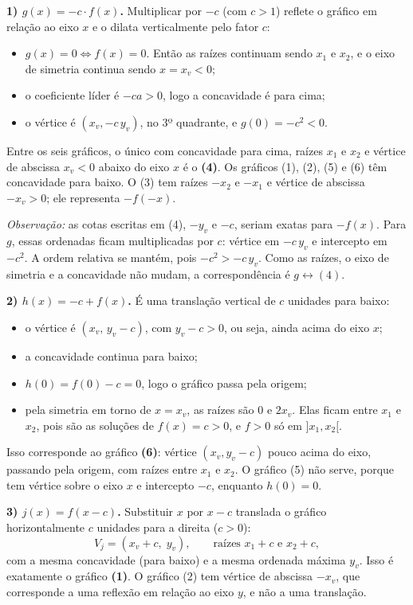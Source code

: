 \documentclass{article}%
\begin{document}
\textbf{1) $g(x)=-c\cdot f(x)$.} Multiplicar por $-c$ (com $c>1$) reflete o gráfico em relação ao eixo $x$ e o dilata verticalmente pelo fator $c$:
\begin{itemize}
\item $g(x)=0 \iff f(x)=0$. Então as raízes continuam sendo $x_1$ e $x_2$, e o eixo de simetria continua sendo $x=x_v<0$;
\item o coeficiente líder é $-ca>0$, logo a concavidade é para cima;
\item o vértice é $(x_v,-c\,y_v)$, no 3º quadrante, e $g(0)=-c^2<0$.
\end{itemize}
Entre os seis gráficos, o único com concavidade para cima, raízes $x_1$ e $x_2$ e vértice de abscissa $x_v<0$ abaixo do eixo $x$ é o \textbf{(4)}. Os gráficos (1), (2), (5) e (6) têm concavidade para baixo. O (3) tem raízes $-x_2$ e $-x_1$ e vértice de abscissa $-x_v>0$; ele representa $-f(-x)$.

\emph{Observação:} as cotas escritas em (4), $-y_v$ e $-c$, seriam exatas para $-f(x)$. Para $g$, essas ordenadas ficam multiplicadas por $c$: vértice em $-c\,y_v$ e intercepto em $-c^2$. A ordem relativa se mantém, pois $-c^2>-c\,y_v$. Como as raízes, o eixo de simetria e a concavidade não mudam, a correspondência é $g\leftrightarrow(4)$.

\textbf{2) $h(x)=-c+f(x)$.} É uma translação vertical de $c$ unidades para baixo:
\begin{itemize}
\item o vértice é $(x_v,\,y_v-c)$, com $y_v-c>0$, ou seja, ainda acima do eixo $x$;
\item a concavidade continua para baixo;
\item $h(0)=f(0)-c=0$, logo o gráfico passa pela origem;
\item pela simetria em torno de $x=x_v$, as raízes são $0$ e $2x_v$. Elas ficam entre $x_1$ e $x_2$, pois são as soluções de $f(x)=c>0$, e $f>0$ só em $]x_1,x_2[$.
\end{itemize}
Isso corresponde ao gráfico \textbf{(6)}: vértice $(x_v,y_v-c)$ pouco acima do eixo, passando pela origem, com raízes entre $x_1$ e $x_2$. O gráfico (5) não serve, porque tem vértice sobre o eixo $x$ e intercepto $-c$, enquanto $h(0)=0$.

\textbf{3) $j(x)=f(x-c)$.} Substituir $x$ por $x-c$ translada o gráfico horizontalmente $c$ unidades para a direita ($c>0$):
\[
V_j=(x_v+c,\;y_v),\qquad \text{raízes } x_1+c \text{ e } x_2+c,
\]
com a mesma concavidade (para baixo) e a mesma ordenada máxima $y_v$. Isso é exatamente o gráfico \textbf{(1)}. O gráfico (2) tem vértice de abscissa $-x_v$, que corresponde a uma reflexão em relação ao eixo $y$, e não a uma translação.
\end{document}
